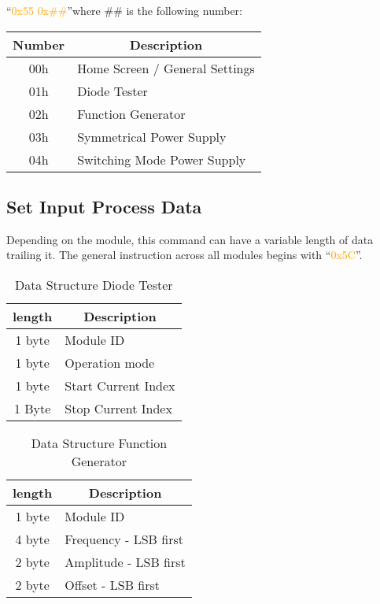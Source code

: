 ``\textcolor{orange}{0x55 0x\#\#}''where \#\# is the following number:

\begin{table}[H]
    \centering
    \begin{tabular}{|c|l|}
        \hline
        \textbf{Number}  & \multicolumn{1}{|c|}{\textbf{Description}}\\ \hline \hline
        00h & Home Screen / General Settings\\ \hline
        01h & Diode Tester \\ \hline
        02h & Function Generator \\ \hline
        03h & Symmetrical Power Supply \\ \hline
        04h & Switching Mode Power Supply \\ \hline
    \end{tabular}
\label{tab:tft_pagecmd}
\end{table}

\subsection{Set Input Process Data}
Depending on the module, this command can have a variable length of data trailing it. The general instruction across all modules begins with ``\textcolor{orange}{0x5C}''.

\begin{table}[H]
    \centering
    \begin{tabular}{|c|l|}
        \hline
        \textbf{length}  & \multicolumn{1}{|c|}{\textbf{Description}}\\ \hline \hline
        1 byte & Module ID\\ \hline
        1 byte & Operation mode \\ \hline
        1 byte & Start Current Index \\ \hline
        1 Byte & Stop Current Index \\ \hline
    \end{tabular}
\caption[Data Structure Diode Tester]{Data Structure Diode Tester}
\label{tab:tft_diode_5C}

\end{table}
\begin{table}[H]
    \centering
    \begin{tabular}{|c|l|}
        \hline
        \textbf{length}  & \multicolumn{1}{|c|}{\textbf{Description}}\\ \hline \hline
        1 byte & Module ID\\ \hline
        4 byte & Frequency - LSB first \\ \hline
        2 byte & Amplitude - LSB first \\ \hline
        2 byte & Offset - LSB first \\ \hline
    \end{tabular}
\caption[Data Structure Function Generator]{Data Structure Function Generator}
\label{tab:tft_fgen_5C}
\end{table}

